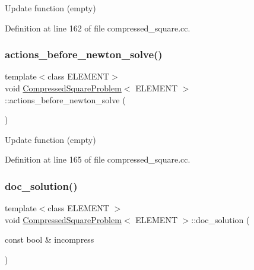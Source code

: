 Update function (empty) 



Definition at line 162 of file compressed\+\_\+square.\+cc.

\mbox{\label{classCompressedSquareProblem_aed8338e212b31c56a5df20c222385e15}} 
\subsubsection{\texorpdfstring{actions\+\_\+before\+\_\+newton\+\_\+solve()}{actions\_before\_newton\_solve()}}
{\footnotesize\ttfamily template$<$class E\+L\+E\+M\+E\+NT$>$ \\
void \hyperlink{classCompressedSquareProblem}{Compressed\+Square\+Problem}$<$ E\+L\+E\+M\+E\+NT $>$\+::actions\+\_\+before\+\_\+newton\+\_\+solve (\begin{DoxyParamCaption}{ }\end{DoxyParamCaption})\hspace{0.3cm}{\ttfamily [inline]}}



Update function (empty) 



Definition at line 165 of file compressed\+\_\+square.\+cc.

\mbox{\label{classCompressedSquareProblem_a34d511f377379122d65b2a1402898f5c}} 
\subsubsection{\texorpdfstring{doc\+\_\+solution()}{doc\_solution()}}
{\footnotesize\ttfamily template$<$class E\+L\+E\+M\+E\+NT $>$ \\
void \hyperlink{classCompressedSquareProblem}{Compressed\+Square\+Problem}$<$ E\+L\+E\+M\+E\+NT $>$\+::doc\+\_\+solution (\begin{DoxyParamCaption}\item[{const bool \&}]{incompress }\end{DoxyParamCaption})}



